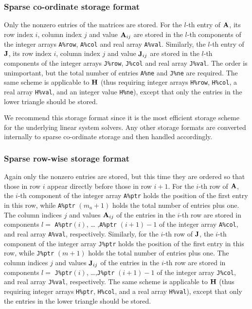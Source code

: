 \documentclass{galahad}
\begin{document}
\subsubsection{Sparse co-ordinate storage format}\label{coordinate}
Only the nonzero entries of the matrices are stored. For the $l$-th
entry of ${\mathbf{A}}$, its row index $i$, column index $j$ and value
${\mathbf{A}}_{ij}$ are stored in the $l$-th components of the integer arrays
{\tt A\%row}, {\tt A\%col} and real array {\tt A\%val}.  Similarly,
the $l$-th entry of ${\mathbf{J}}$, its row index $i$, column index $j$ and
value ${\mathbf{J}}_{ij}$ are stored in the $l$-th components of the integer
arrays {\tt J\%row}, {\tt J\%col} and real array {\tt J\%val}.  The
order is unimportant, but the total number of entries {\tt A\%ne} and
{\tt J\%ne} are required.  The same scheme is applicable to ${\mathbf{H}}$
(thus requiring integer arrays {\tt H\%row}, {\tt H\%col}, a real
array {\tt H\%val}, and an integer value {\tt H\%ne}), except that only
the entries in the lower triangle should be stored.

We recommend this storage format since it is the most efficient
storage scheme for the underlying linear system solvers.  Any other
storage formats are converted internally to sparse co-ordinate
storage and then handled accordingly.

\subsubsection{Sparse row-wise storage format}\label{rowwise}
Again only the nonzero entries are stored, but this time they are
ordered so that those in row $i$ appear directly before those in row
$i+1$. For the $i$-th row of ${\mathbf{A}}$, the $i$-th component of the integer
array {\tt A\%ptr} holds the position of the first entry in this row,
while {\tt A\%ptr} $(m_a+1)$ holds the total number of entries plus one.
The column indices $j$ and values ${\mathbf{A}}_{ij}$ of the entries in the
$i$-th row are stored in components $l =$ {\tt A\%ptr}$(i)$, \ldots
,{\tt A\%ptr} $(i+1)-1$ of the integer array {\tt A\%col}, and real
array {\tt A\%val}, respectively.  Similarly, for the $i$-th row of
${\mathbf{J}}$, the $i$-th component of the integer array {\tt J\%ptr} holds the
position of the first entry in this row, while {\tt J\%ptr} $(m+1)$
holds the total number of entries plus one.  The column indices $j$
and values ${\mathbf{J}}_{ij}$ of the entries in the $i$-th row are stored in
components $l =$ {\tt J\%ptr}$(i)$, \ldots ,{\tt J\%ptr} $(i+1)-1$ of
the integer array {\tt J\%col}, and real array {\tt J\%val},
respectively.  The same scheme is applicable to
${\mathbf{H}}$ (thus requiring integer arrays {\tt H\%ptr}, {\tt H\%col}, and
a real array {\tt H\%val}),
except that only the entries in the lower triangle should be stored.
\end{document}
